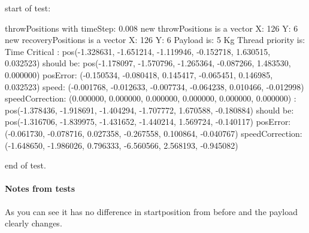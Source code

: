 start of test: \newline 

throwPositions with timeStep:  0.008
\newline new throwPositions is a vector X: 126 Y:  6
\newline new recoveryPositions is a vector X: 126 Y:  6
\newline Payload is:  5  Kg
\newline Thread priority is: Time Critical
\newline[0.000000s - Step 0/126]:
\newline \hspace{1cm}        pos(-1.328631, -1.651214, -1.119946, -0.152718, 1.630515, 0.032523) should be:
\newline \hspace{1cm}        pos(-1.178097, -1.570796, -1.265364, -0.087266, 1.483530, 0.000000)
\newline \hspace{1cm}        posError: (-0.150534, -0.080418, 0.145417, -0.065451, 0.146985, 0.032523)
\newline \hspace{1cm}        speed: (-0.001768, -0.012633, -0.007734, -0.064238, 0.010466, -0.012998)
\newline \hspace{1cm}        speedCorrection: (0.000000, 0.000000, 0.000000, 0.000000, 0.000000, 0.000000)
\newline[1.000000s - Step 125/126]:
\newline \hspace{1cm}        pos(-1.378436, -1.918691, -1.404294, -1.707772, 1.670588, -0.180884) should be:
\newline \hspace{1cm}        pos(-1.316706, -1.839975, -1.431652, -1.440214, 1.569724, -0.140117)
\newline \hspace{1cm}        posError: (-0.061730, -0.078716, 0.027358, -0.267558, 0.100864, -0.040767)
\newline \hspace{1cm}        speedCorrection: (-1.648650, -1.986026, 0.796333, -6.560566, 2.568193, -0.945082)

end of test.\newline 

\paragraph{Notes from tests}
As you can see it has no difference in startposition from before and the payload clearly changes.\newline

